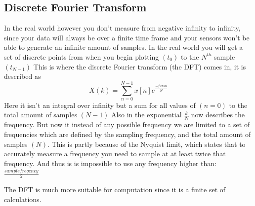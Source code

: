 \documentclass[11pt, A4, oneside]{article}
\begin{document}
\subsection{Discrete Fourier Transform}

In the real world however you don't measure from negative infinity to infinity, since your data will always be over a finite time frame and your sensors won't be able to generate an infinite amount of samples. In the real world you will get a set of discrete points from when you begin plotting \((t_0)\) to the \(N^{th}\) sample \((t_{N-1})\) This is where the discrete Fourier transform (the DFT) comes in, it is described as \[X(k) = \sum_{n = 0}^{N -1} x[n]e^{\frac{-j 2 \pi k n}{N}}\]
Here it isn't an integral over infinity but a sum for all values of \((n = 0)\) to the total amount of samples \((N -1)\) Also in the exponential \(\frac{k}{N}\) now describes the frequency. But now it instead of any possible frequency we are limited to a set of frequencies which are defined by the sampling frequency, and the total amount of samples \((N)\). This is partly because of the Nyquist limit, which states that to accurately measure a frequency you need to sample at at least twice that frequency. And thus is is impossible to use any frequency higher than: $\frac{sample freqency}{2}$

The DFT is much more suitable for computation since it is a finite set of calculations. 
\end{document}
